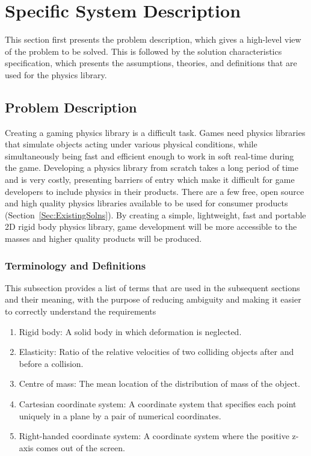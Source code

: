 \documentclass[12pt]{article}
\begin{document}
\section{Specific System Description}
\label{Sec:SpecSystDesc}
This section first presents the problem description, which gives a high-level view of the problem to be solved. This is followed by the solution characteristics specification, which presents the assumptions, theories, and definitions that are used for the physics library.
\subsection{Problem Description}
\label{Sec:ProbDesc}
Creating a gaming physics library is a difficult task. Games need physics libraries that simulate objects acting under various physical conditions, while simultaneously being fast and efficient enough to work in soft real-time during the game. Developing a physics library from scratch takes a long period of time and is very costly, presenting barriers of entry which make it difficult for game developers to include physics in their products. There are a few free, open source and high quality physics libraries available to be used for consumer products (Section~\ref{Sec:ExistingSolns}). By creating a simple, lightweight, fast and portable 2D rigid body physics library, game development will be more accessible to the masses and higher quality products will be produced.
\subsubsection{Terminology and Definitions}
\label{Sec:TermDefs}
This subsection provides a list of terms that are used in the subsequent sections and their meaning, with the purpose of reducing ambiguity and making it easier to correctly understand the requirements
\begin{enumerate}
\item{Rigid body: A solid body in which deformation is neglected.}
\item{Elasticity: Ratio of the relative velocities of two colliding objects after and before a collision.}
\item{Centre of mass: The mean location of the distribution of mass of the object.}
\item{Cartesian coordinate system: A coordinate system that specifies each point uniquely in a plane by a pair of numerical coordinates.}
\item{Right-handed coordinate system: A coordinate system where the positive z-axis comes out of the screen.}
\end{enumerate}
\end{document}
